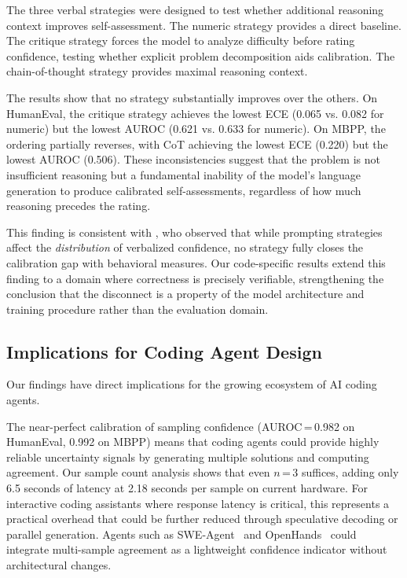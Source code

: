 \documentclass{article}
\begin{document}
The three verbal strategies were designed to test whether additional reasoning context improves self-assessment. The numeric strategy provides a direct baseline. The critique strategy forces the model to analyze difficulty before rating confidence, testing whether explicit problem decomposition aids calibration. The chain-of-thought strategy provides maximal reasoning context.

The results show that no strategy substantially improves over the others. On HumanEval, the critique strategy achieves the lowest ECE (0.065 vs. 0.082 for numeric) but the lowest AUROC (0.621 vs. 0.633 for numeric). On MBPP, the ordering partially reverses, with CoT achieving the lowest ECE (0.220) but the lowest AUROC (0.506). These inconsistencies suggest that the problem is not insufficient reasoning but a fundamental inability of the model's language generation to produce calibrated self-assessments, regardless of how much reasoning precedes the rating.

This finding is consistent with \citet{xiong2024can}, who observed that while prompting strategies affect the \emph{distribution} of verbalized confidence, no strategy fully closes the calibration gap with behavioral measures. Our code-specific results extend this finding to a domain where correctness is precisely verifiable, strengthening the conclusion that the disconnect is a property of the model architecture and training procedure rather than the evaluation domain.

\subsection{Implications for Coding Agent Design}
\label{sec:implications}

Our findings have direct implications for the growing ecosystem of AI coding agents.

The near-perfect calibration of sampling confidence (AUROC\,=\,0.982 on HumanEval, 0.992 on MBPP) means that coding agents could provide highly reliable uncertainty signals by generating multiple solutions and computing agreement. Our sample count analysis shows that even $n$\,=\,3 suffices, adding only 6.5 seconds of latency at 2.18 seconds per sample on current hardware. For interactive coding assistants where response latency is critical, this represents a practical overhead that could be further reduced through speculative decoding or parallel generation. Agents such as SWE-Agent~\citep{yang2024swe} and OpenHands~\citep{wang2024opendevin} could integrate multi-sample agreement as a lightweight confidence indicator without architectural changes.
\end{document}
